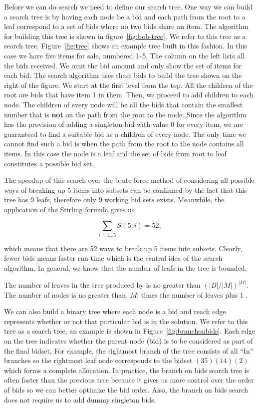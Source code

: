 Before we can do search we need to define our search tree. One way we
can build a search tree is by having each node be a bid and each path
from the root to a leaf correspond to a set of bids where no two bids
share an item. The algorithm for building this tree is shown in
figure~\ref{fig:bob-tree}. We refer to this tree as a  search tree. Figure~\ref{fig:tree} shows an example tree
built in this fashion. In this case we have five items for sale,
numbered 1--5.  The column on the left lists all the bids received. We
omit the bid amount and only show the set of items for each bid. The
search algorithm uses these bids to build the tree shown on the right
of the figure.  We start at the first level from the top.  All the
children of the root are bids that have item 1 in them. Then, we
proceed to add children to each node.  The children of every node will
be all the bids that contain the smallest number that is \textbf{not}
on the path from the root to the node. Since the algorithm has the
provision of adding a singleton bid with value 0 for every item, we
are guaranteed to find a suitable bid as a children of every node. The
only time we cannot find such a bid is when the path from the root to
the node contains all items. In this case the node is a leaf and the
set of bids from root to leaf constitutes a possible bid set.

The speedup of this search over the brute force method of considering
all possible ways of breaking up 5 items into subsets can be confirmed
by the fact that this tree has 9 leafs, therefore only 9 working bid
sets exists. Meanwhile, the application of the Stirling formula gives
us

\[\sum_{i = 1\ldots5} S(5,i) = 52,\]

which means that there are 52 ways to break up 5 items into subsets.
Clearly, fewer bids means faster run time which is the central idea of
the search algorithm. In general, we know that the number of leafs in the
tree is bounded.
\begin{theorem}
  The number of leaves in the tree produced by
   is no greater than
  $(|B|/|M|)^{|M|}$. The number of nodes is no greater than $|M|$
  times the number of leaves plus 1 \cite{sandholm02b}.
\end{theorem}

We can also build a binary tree where each node is a bid and reach
edge represents whether or not that particular bid is in the solution.
We refer to this tree as a  search tree, an example
is shown in Figure~\ref{fig:branchonbids}. Each edge on the tree
indicates whether the parent node (bid) is to be considered as part of
the final bidset. For example, the rightmost branch of the tree
consists of all ``In'' branches so the rightmost leaf node corresponds
to the bidset $(35)(14)(2)$ which forms a complete allocation. In
practice, the branch on bids search tree is often faster than the
previous tree because it gives us more control over the order of bids
so we can better optimize the bid order. Also, the branch on bids
search does not require us to add dummy singleton bids.


